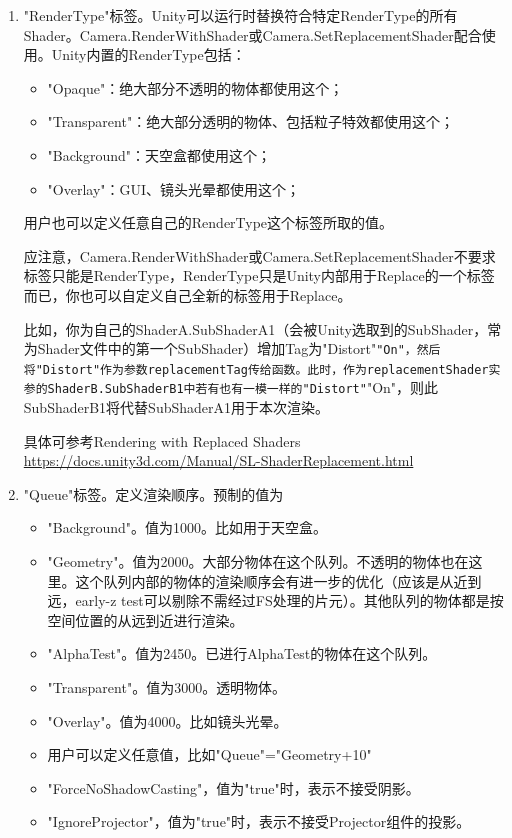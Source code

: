 \documentclass[9pt, b5paper]{article}
\begin{document}
\begin{enumerate}
\item "RenderType"标签。Unity可以运行时替换符合特定RenderType的所有Shader。Camera.RenderWithShader或Camera.SetReplacementShader配合使用。Unity内置的RenderType包括：
\label{sec:orgd1e1ca4}
\begin{itemize}
\item "Opaque"：绝大部分不透明的物体都使用这个；
\item "Transparent"：绝大部分透明的物体、包括粒子特效都使用这个；
\item "Background"：天空盒都使用这个；
\item "Overlay"：GUI、镜头光晕都使用这个；
\end{itemize}

用户也可以定义任意自己的RenderType这个标签所取的值。

应注意，Camera.RenderWithShader或Camera.SetReplacementShader不要求标签只能是RenderType，RenderType只是Unity内部用于Replace的一个标签而已，你也可以自定义自己全新的标签用于Replace。

比如，你为自己的ShaderA.SubShaderA1（会被Unity选取到的SubShader，常为Shader文件中的第一个SubShader）增加Tag为"Distort"\texttt{"On"，然后将"Distort"作为参数replacementTag传给函数。此时，作为replacementShader实参的ShaderB.SubShaderB1中若有也有一模一样的"Distort"}"On"，则此SubShaderB1将代替SubShaderA1用于本次渲染。

具体可参考Rendering with Replaced Shaders \url{https://docs.unity3d.com/Manual/SL-ShaderReplacement.html}

\item "Queue"标签。定义渲染顺序。预制的值为
\label{sec:orgcf82ea1}
\begin{itemize}
\item "Background"。值为1000。比如用于天空盒。
\item "Geometry"。值为2000。大部分物体在这个队列。不透明的物体也在这里。这个队列内部的物体的渲染顺序会有进一步的优化（应该是从近到远，early-z test可以剔除不需经过FS处理的片元）。其他队列的物体都是按空间位置的从远到近进行渲染。
\item "AlphaTest"。值为2450。已进行AlphaTest的物体在这个队列。
\item "Transparent"。值为3000。透明物体。
\item "Overlay"。值为4000。比如镜头光晕。
\item 用户可以定义任意值，比如"Queue"="Geometry+10"
\item "ForceNoShadowCasting"，值为"true"时，表示不接受阴影。
\item "IgnoreProjector"，值为"true"时，表示不接受Projector组件的投影。
\end{itemize}


\end{enumerate}
\end{document}
